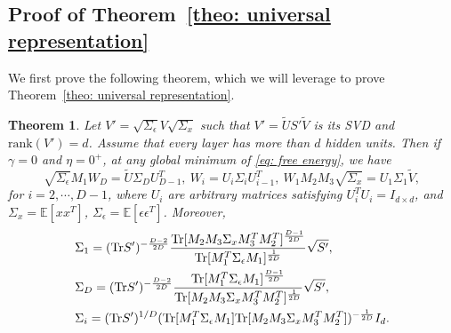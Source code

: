 \documentclass{article}
\theoremstyle{plain}
\newtheorem{theorem}{Theorem}
\newcommand{\Tr}{{\rm Tr}}
\begin{document}


\subsection{Proof of Theorem~\ref{theo: universal representation}}

We first prove the following theorem, which we will leverage to prove Theorem~\ref{theo: universal representation}.

\begin{theorem}
\label{theo:deep_linear}
Let $V'=\sqrt{\Sigma_\epsilon}V\sqrt{\Sigma_x}$ such that $V'=\tilde{U}S'\tilde{V}$ is its SVD and $\text{rank}(V')=d$. Assume that every layer has more than $d$ hidden units. Then if $\gamma=0$ and $\eta=0^+$, at any global minimum of \eqref{eq: free energy}, we have
\begin{equation}
\sqrt{\Sigma_\epsilon}M_1W_{D}=\tilde{U}\Sigma_DU_{D-1}^T,\ W_i=U_i\Sigma_iU_{i-1}^T,\ W_1M_2M_3\sqrt{\Sigma_x}=U_1\Sigma_1\tilde{V},
\end{equation}
for $i=2,\cdots,D-1$, where $U_i$ are arbitrary matrices satisfying $U_i^TU_i=I_{d\times d}$, and $\Sigma_x=\mathbb{E}[xx^T]$, $\Sigma_\epsilon=\mathbb{E}[\epsilon\epsilon^T]$. Moreover,
\begin{equation}
\begin{aligned}
&\Sigma_1=(\Tr S')^{-\frac{D-2}{2D}}\frac{\Tr[M_2M_3\Sigma_xM_3^TM_2^T]^{\frac{D-1}{2D}}}{\Tr[M_1^T\Sigma_\epsilon M_1]^{\frac{1}{2D}}}\sqrt{S'},\\
&\Sigma_D=(\Tr S')^{-\frac{D-2}{2D}}\frac{\Tr[M_1^T\Sigma_\epsilon M_1]^{\frac{D-1}{2D}}}{\Tr[M_2M_3\Sigma_xM_3^TM_2^T]^{\frac{1}{2D}}}\sqrt{S'},\\
&\Sigma_i=(\Tr S')^{1/D}(\Tr[M_1^T\Sigma_\epsilon M_1]\Tr[M_2M_3\Sigma_xM_3^TM_2^T])^{-\frac{1}{2D}}I_d.
\end{aligned}
\end{equation}
\end{theorem}
\end{document}
